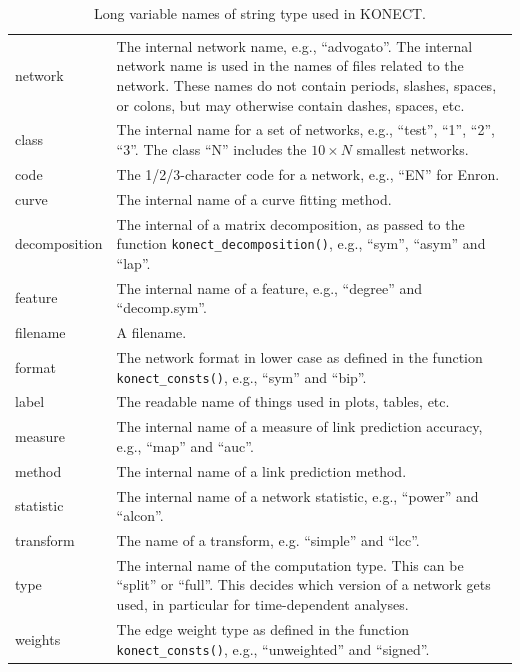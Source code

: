 \documentclass{article}
\begin{document}
\begin{table}
  \caption{ 
    Long variable names of string type used in KONECT.
    \label{tab:string-variables}
  } 
  \centering
  \begin{tabular}{>{\ttfamily}lp{}}
    \toprule 
    network & The internal network name, e.g., ``advogato''.
    The internal network name is used in the names of files related to
    the network.  These names do not contain periods, slashes, spaces,
    or colons, but may otherwise contain dashes, spaces, etc.  \\ 
    class &
    The internal name for a set of networks, e.g., ``test'', ``1'',
    ``2'', ``3''. The class ``N'' includes the $10\times N$ smallest
    networks. \\ 
    code & The 1/2/3-character code for a network, e.g.,
    ``EN'' for Enron.  \\ 
    curve & The internal name of a curve fitting method. \\ 
    decomposition & The internal of a matrix decomposition, as passed to the function
    \texttt{konect\_decomposition()}, e.g., ``sym'', ``asym'' and ``lap''. \\ 
    feature & The internal name of a
    feature, e.g., ``degree'' and ``decomp.sym''.  \\ 
    filename & A filename. \\ 
    format & The network format in lower case as defined in
    the function \texttt{konect\_consts()}, e.g., ``sym'' and ``bip''. \\ 
    label &
    The readable name of things used in plots, tables, etc.  \\ 
    measure & The internal name of a measure
    of link prediction accuracy, e.g., ``map'' and ``auc''. \\ 
    method & The internal name of a
    link prediction method.  \\ 
    statistic & The internal name of a network
    statistic, e.g., ``power'' and ``alcon''.  \\ 
    transform & The name of a transform, e.g. ``simple'' and ``lcc''. \\
    type & The internal name of
    the computation type. This can be ``split'' or ``full''. This
    decides which version of a network gets used, in particular for
    time-dependent analyses.  \\ 
    weights & The edge weight type as defined in the function
    \texttt{konect\_consts()}, e.g., ``unweighted'' and
    ``signed''. \\ 

    \bottomrule
\end{tabular}
\end{table}
\end{document}

